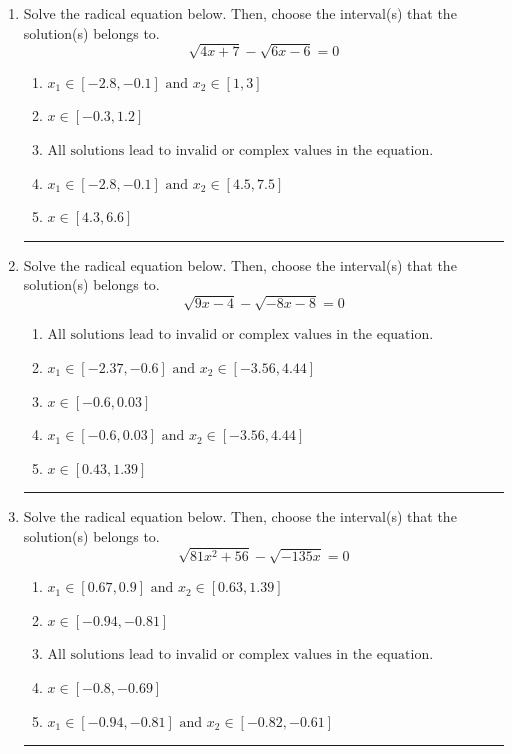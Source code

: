 \documentclass[14pt]{extbook}
\newcommand{\litem}[1]{\item#1\hspace*{-1cm}\rule{\textwidth}{0.4pt}}
\begin{document}
\begin{enumerate}
{\begin{enumerate}[label=\Alph*.]
\end{enumerate} }
\litem{
Solve the radical equation below. Then, choose the interval(s) that the solution(s) belongs to.\[ \sqrt{4 x + 7} - \sqrt{6 x - 6} = 0 \]\begin{enumerate}[label=\Alph*.]
\item \( x_1 \in [-2.8, -0.1] \text{ and } x_2 \in [1,3] \)
\item \( x \in [-0.3,1.2] \)
\item \( \text{All solutions lead to invalid or complex values in the equation.} \)
\item \( x_1 \in [-2.8, -0.1] \text{ and } x_2 \in [4.5,7.5] \)
\item \( x \in [4.3,6.6] \)

\end{enumerate} }
\litem{
Solve the radical equation below. Then, choose the interval(s) that the solution(s) belongs to.\[ \sqrt{9 x - 4} - \sqrt{-8 x - 8} = 0 \]\begin{enumerate}[label=\Alph*.]
\item \( \text{All solutions lead to invalid or complex values in the equation.} \)
\item \( x_1 \in [-2.37, -0.6] \text{ and } x_2 \in [-3.56,4.44] \)
\item \( x \in [-0.6,0.03] \)
\item \( x_1 \in [-0.6, 0.03] \text{ and } x_2 \in [-3.56,4.44] \)
\item \( x \in [0.43,1.39] \)

\end{enumerate} }
\litem{
Solve the radical equation below. Then, choose the interval(s) that the solution(s) belongs to.\[ \sqrt{81 x^2 + 56} - \sqrt{-135 x} = 0 \]\begin{enumerate}[label=\Alph*.]
\item \( x_1 \in [0.67, 0.9] \text{ and } x_2 \in [0.63,1.39] \)
\item \( x \in [-0.94,-0.81] \)
\item \( \text{All solutions lead to invalid or complex values in the equation.} \)
\item \( x \in [-0.8,-0.69] \)
\item \( x_1 \in [-0.94, -0.81] \text{ and } x_2 \in [-0.82,-0.61] \)

\end{enumerate} }
\end{enumerate}
\end{document}
